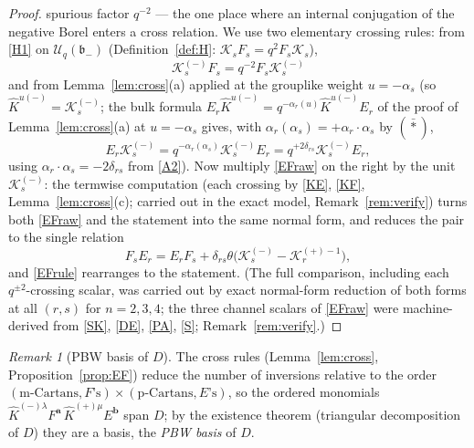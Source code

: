 \documentclass[11pt]{article}
\theoremstyle{definition}
\theoremstyle{remark}
\newtheorem{remark}[theorem]{Remark}
\newcommand{\Uq}{\mathcal{U}_q}
\newcommand{\bm}{\mathfrak{b}_-}
\newcommand{\del}{\delta}
\newcommand{\hK}{\hat K}
\newcommand{\cK}{\mathcal K}
\newcommand{\tht}{\theta}
\begin{document}
\begin{proof}
spurious factor $q^{-2}$ — the one place where an internal
conjugation of the negative Borel enters a cross relation.  We use
two elementary crossing rules: from \eqref{H1} on $\Uq(\bm)$
(Definition~\ref{def:H}: $\cK_sF_s=q^{2}F_s\cK_s$),
\begin{equation}
\cK_s^{(-)}F_s=q^{-2}F_s\cK_s^{(-)}
\label{KF}\tag{KF}
\end{equation}
and from Lemma~\ref{lem:cross}(a) applied at the grouplike weight
$u=-\alpha_s$ (so $\hK^{u(-)}=\cK_s^{(-)}$; the bulk formula
$E_r\hK^{u(-)}=q^{-\alpha_r(u)}\hK^{u(-)}E_r$ of the proof of
Lemma~\ref{lem:cross}(a) at $u=-\alpha_s$ gives, with
$\alpha_r(\alpha_s)=+\alpha_r\cdot\alpha_s$ by $(\bar\ast)$,
\begin{equation}
E_r\cK_s^{(-)}=q^{-\alpha_r(\alpha_s)}\cK_s^{(-)}E_r
 =q^{+2\del_{rs}}\cK_s^{(-)}E_r ,
\label{KE}\tag{KE}
\end{equation}
using $\alpha_r\cdot\alpha_s=-2\del_{rs}$ from \eqref{A2}).
Now multiply \eqref{EFraw} on the right by the unit $\cK_s^{(-)}$:
the termwise computation (each crossing by \eqref{KE}, \eqref{KF},
Lemma~\ref{lem:cross}(c); carried out in the exact model,
Remark~\ref{rem:verify}) turns both \eqref{EFraw} and the statement
into the same normal form, and reduces the pair to the single
relation
\begin{equation}
F_sE_r=E_rF_s+\del_{rs}\tht\bigl(\cK_s^{(-)}-\cK_r^{(+)-1}\bigr),
\label{EFrule}\tag{EF$'$}
\end{equation}
and \eqref{EFrule} rearranges to the statement.  (The full
comparison, including each $q^{\pm2}$-crossing scalar, was carried
out by exact normal-form reduction of both forms at all $(r,s)$ for
$n=2,3,4$; the three channel scalars of \eqref{EFraw} were
machine-derived from \eqref{SK}, \eqref{DE}, \eqref{PA}, \eqref{S};
Remark~\ref{rem:verify}.)
\end{proof}

\begin{remark}[PBW basis of $D$]\label{rem:pbwD}
The cross rules (Lemma~\ref{lem:cross},
Proposition~\ref{prop:EF}) reduce the number of inversions relative to
the order $(\text{m-Cartans},F\text{'s})\times
(\text{p-Cartans},E\text{'s})$, so the ordered monomials
$\hK^{(-)\lambda}F^{\mathbf a}\,\hK^{(+)\mu}E^{\mathbf b}$ span $D$;
by the existence theorem (triangular decomposition of $D$) they are a
basis, the \emph{PBW basis} of $D$.
\end{remark}
\end{document}
